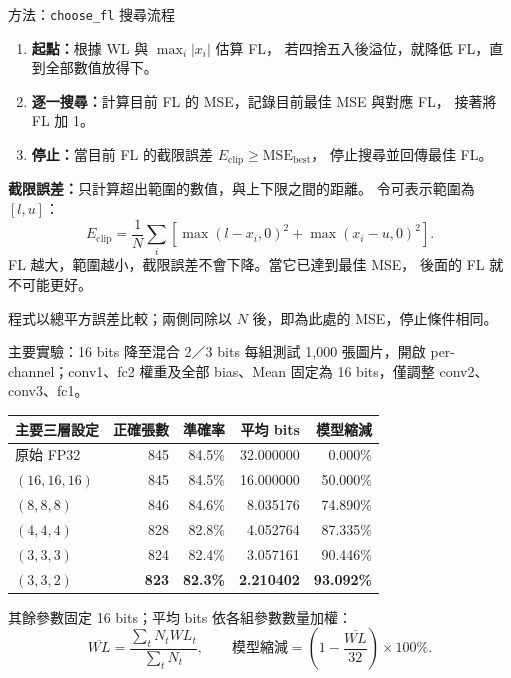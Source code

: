 \documentclass[aspectratio=169,11pt]{beamer}
\begin{document}
\begin{frame}{方法：\texttt{choose\_fl} 搜尋流程}
  \small
  \begin{enumerate}
    \item \textbf{起點：}根據 WL 與 $\max_i|x_i|$ 估算 FL，
          若四捨五入後溢位，就降低 FL，直到全部數值放得下。
    \item \textbf{逐一搜尋：}計算目前 FL 的 MSE，記錄目前最佳 MSE 與對應 FL，
          接著將 FL 加 1。
    \item \textbf{停止：}當目前 FL 的截限誤差
          $E_{\mathrm{clip}}\geq\mathrm{MSE}_{\mathrm{best}}$，
          停止搜尋並回傳最佳 FL。
  \end{enumerate}

  \vspace{0.5em}
  \textbf{截限誤差：}只計算超出範圍的數值，與上下限之間的距離。
  令可表示範圍為 $[l,u]$：
  \[
    E_{\mathrm{clip}}=\frac{1}{N}\sum_i
      \left[\max(l-x_i,0)^2+\max(x_i-u,0)^2\right].
  \]
  FL 越大，範圍越小，截限誤差不會下降。當它已達到最佳 MSE，
  後面的 FL 就不可能更好。
  \vspace{0.3em}

  \footnotesize
  程式以總平方誤差比較；兩側同除以 $N$ 後，即為此處的 MSE，停止條件相同。
\end{frame}



\begin{frame}{主要實驗：16 bits 降至混合 2／3 bits}
  \small
  每組測試 1,000 張圖片，開啟 per-channel；conv1、fc2 權重及全部 bias、Mean
  固定為 16 bits，僅調整 conv2、conv3、fc1。

  \vspace{0.5em}
  \centering
  \begin{tabular}{lrrrr}
    \toprule
    主要三層設定 & 正確張數 & 準確率 & 平均 bits & 模型縮減 \\
    \midrule
    原始 FP32 & 845 & 84.5\% & 32.000000 & 0.000\% \\
    $(16,16,16)$ & 845 & 84.5\% & 16.000000 & 50.000\% \\
    $(8,8,8)$ & 846 & 84.6\% & 8.035176 & 74.890\% \\
    $(4,4,4)$ & 828 & 82.8\% & 4.052764 & 87.335\% \\
    $(3,3,3)$ & 824 & 82.4\% & 3.057161 & 90.446\% \\
    \textbf{$(3,3,2)$} & \textbf{823} & \textbf{82.3\%} & \textbf{2.210402} & \textbf{93.092\%} \\
    \bottomrule
  \end{tabular}

  \vspace{0.7em}
  \begin{flushleft}
    其餘參數固定 16 bits；平均 bits 依各組參數數量加權：
    \[
      \overline{WL}=\frac{\sum_t N_t WL_t}{\sum_t N_t},\qquad
      \text{模型縮減}=\left(1-\frac{\overline{WL}}{32}\right)\times100\%.
    \]
  \end{flushleft}
\end{frame}
\end{document}
